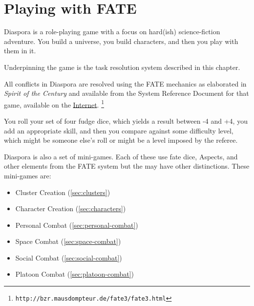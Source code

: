 \chapter{Playing with FATE}
\label{cha:playing-with-fate}

Diaspora is a role-playing game with a focus on hard(ish) science-fiction adventure. You build a universe, you build characters, and then you play with them in it.

Underpinning the game is the task resolution system described in this chapter.

All conflicts in Diaspora are resolved using the FATE mechanics as elaborated in \emph{Spirit of the Century} and available from the System Reference Document for that game, available on the \href{http://bzr.mausdompteur.de/fate3/fate3.html}{Internet}.%
\footnote{ \texttt{http://bzr.mausdompteur.de/fate3/fate3.html} }

You roll your set of four fudge dice, which yields a result between -4 and +4, you add an appropriate skill, and then you compare against some difficulty level, which might be someone else's roll or might be a level imposed by the referee.



Diaspora is also a set of mini-games. Each of these use fate dice, Aspects, and other elements from the FATE system but the may have other distinctions.  These mini-games are:

\begin{itemize}
\item Cluster Creation (\autoref{sec:clusters})
\item Character Creation (\autoref{sec:characters})
\item Personal Combat (\autoref{sec:personal-combat})
\item Space Combat (\autoref{sec:space-combat})
\item Social Combat (\autoref{sec:social-combat})
\item Platoon Combat (\autoref{sec:platoon-combat})
\end{itemize}


% 








